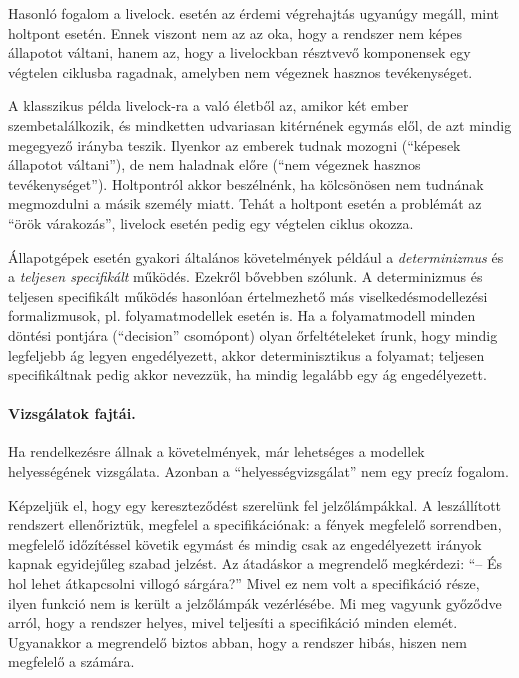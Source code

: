 Hasonló fogalom a livelock.  esetén az érdemi végrehajtás ugyanúgy megáll, mint holtpont esetén. Ennek viszont nem az az oka, hogy a rendszer nem képes állapotot váltani, hanem az, hogy a livelockban résztvevő komponensek egy végtelen ciklusba ragadnak, amelyben nem végeznek hasznos tevékenységet.

\begin{pelda}
A klasszikus példa livelock-ra a való életből az, amikor két ember szembetalálkozik, és mindketten udvariasan kitérnének egymás elől, de azt mindig megegyező irányba teszik. Ilyenkor az emberek tudnak mozogni (``képesek állapotot váltani''), de nem haladnak előre (``nem végeznek hasznos tevékenységet''). Holtpontról akkor beszélnénk, ha kölcsönösen nem tudnának megmozdulni a másik személy miatt. Tehát a holtpont esetén a problémát az ``örök várakozás'', livelock esetén pedig egy végtelen ciklus okozza.
\end{pelda}

Állapotgépek esetén gyakori általános követelmények például a \emph{determinizmus} és a \emph{teljesen specifikált} működés. Ezekről bővebben  szólunk. A determinizmus és teljesen specifikált működés hasonlóan értelmezhető más viselkedésmodellezési formalizmusok, pl. folyamatmodellek esetén is. Ha a folyamatmodell minden döntési pontjára (``decision'' csomópont) olyan őrfeltételeket írunk, hogy mindig legfeljebb ág legyen engedélyezett, akkor determinisztikus a folyamat; teljesen specifikáltnak pedig akkor nevezzük, ha mindig legalább egy ág engedélyezett.

\paragraph{Vizsgálatok fajtái.}
Ha rendelkezésre állnak a követelmények, már lehetséges a modellek helyességének vizsgálata. Azonban a ``helyességvizsgálat'' nem egy precíz fogalom. 

\begin{pelda}
Képzeljük el, hogy egy kereszteződést szerelünk fel jelzőlámpákkal. A leszállított rendszert ellenőriztük, megfelel a specifikációnak: a fények megfelelő sorrendben, megfelelő időzítéssel követik egymást és mindig csak az engedélyezett irányok kapnak egyidejűleg szabad jelzést. Az átadáskor a megrendelő megkérdezi: ``-- És hol lehet átkapcsolni villogó sárgára?'' Mivel ez nem volt a specifikáció része, ilyen funkció nem is került a jelzőlámpák vezérlésébe. Mi meg vagyunk győződve arról, hogy a rendszer helyes, mivel teljesíti a specifikáció minden elemét. Ugyanakkor a megrendelő biztos abban, hogy a rendszer hibás, hiszen nem megfelelő a számára.
\end{pelda}

